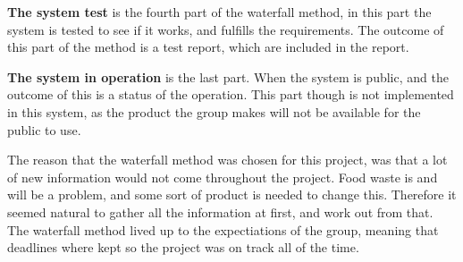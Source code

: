 \textbf{The system test} is the fourth part of the waterfall method, in this part the system is tested to see if it works, and fulfills the requirements. The outcome of this part of the method is a test report, which are included in the report.

\textbf{The system in operation} is the last part. When the system is public, and the outcome of this is a status of the operation. This part though is not implemented in this system, as the product the group makes will not be available for the public to use.

The reason that the waterfall method was chosen for this project, was that a lot of new information would not come throughout the project. Food waste is and will be a problem, and some sort of product is needed to change this. Therefore it seemed natural to gather all the information at first, and work out from that. The waterfall method lived up to the expectiations of the group, meaning that deadlines where kept so the project was on track all of the time.